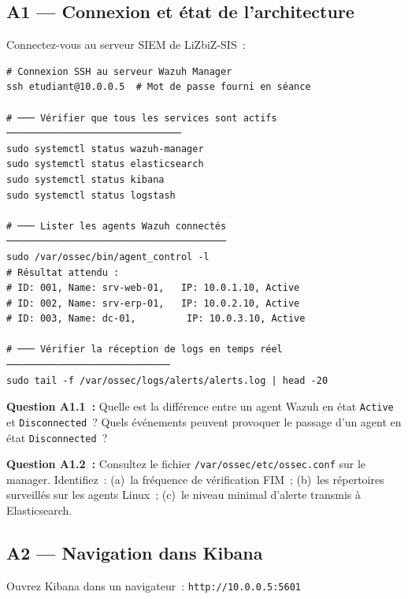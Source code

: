 \subsection{A1 — Connexion et état de l'architecture}

Connectez-vous au serveur SIEM de LiZbiZ-SIS~:

\begin{lstlisting}[style=StyleTerminal,
  caption={Connexion initiale au SIEM et vérification des services},
  label={lst:lab1-connexion}]
# Connexion SSH au serveur Wazuh Manager
ssh etudiant@10.0.0.5  # Mot de passe fourni en séance

# ─── Vérifier que tous les services sont actifs ───────────────────────────────
sudo systemctl status wazuh-manager
sudo systemctl status elasticsearch
sudo systemctl status kibana
sudo systemctl status logstash

# ─── Lister les agents Wazuh connectés ───────────────────────────────────────
sudo /var/ossec/bin/agent_control -l
# Résultat attendu :
# ID: 001, Name: srv-web-01,   IP: 10.0.1.10, Active
# ID: 002, Name: srv-erp-01,   IP: 10.0.2.10, Active
# ID: 003, Name: dc-01,         IP: 10.0.3.10, Active

# ─── Vérifier la réception de logs en temps réel ─────────────────────────────
sudo tail -f /var/ossec/logs/alerts/alerts.log | head -20
\end{lstlisting}

\begin{boxexo}
\textbf{Question A1.1~:} Quelle est la différence entre un agent Wazuh
en état \texttt{Active} et \texttt{Disconnected}~? Quels événements
peuvent provoquer le passage d'un agent en état \texttt{Disconnected}~?

\medskip\textbf{Question A1.2~:} Consultez le fichier
\texttt{/var/ossec/etc/ossec.conf} sur le manager. Identifiez~:
(a)~la fréquence de vérification FIM~; (b)~les répertoires surveillés
sur les agents Linux~; (c)~le niveau minimal d'alerte transmis à Elasticsearch.
\end{boxexo}

\subsection{A2 — Navigation dans Kibana}

Ouvrez Kibana dans un navigateur~: \texttt{http://10.0.0.5:5601}

